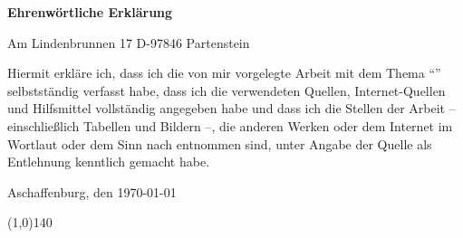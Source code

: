 \vspace*{0.5cm}
\begin{center}
   \huge{\textbf{Ehrenwörtliche Erklärung}}
\end{center}

   \thispagestyle{empty}
   
   \vspace{3cm}
   
   \Author
   
   Am Lindenbrunnen 17\newline
   D-97846 Partenstein
   
   \vspace{2cm}
   
   Hiermit erkläre ich, dass ich die von mir vorgelegte Arbeit mit dem Thema "`\textit{\Topic}"' selbstständig verfasst habe, dass ich die verwendeten Quellen, Internet-Quellen und Hilfsmittel vollständig angegeben habe und dass ich die Stellen der Arbeit -- einschließlich Tabellen und Bildern --, die anderen Werken oder dem Internet im Wortlaut oder dem Sinn nach entnommen sind, unter Angabe der Quelle als Entlehnung kenntlich gemacht habe.
   
   \vspace{3cm}
   
   Aschaffenburg, den \today
     
   \vspace{1cm}   
   \line(1,0){140}
   \newline
   \hspace*{10mm} \Author
